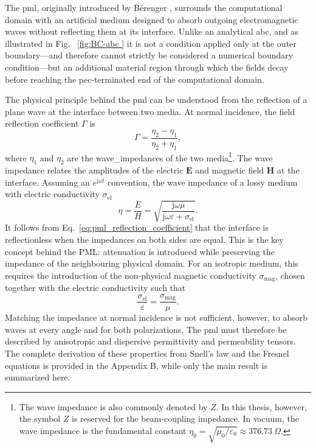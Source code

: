 The \gls{pml}, originally introduced by Bérenger \cite{berenger_perfectly_1994}, surrounds the computational domain with an artificial medium designed to absorb outgoing electromagnetic waves without reflecting them at its interface. Unlike an analytical \gls{abc}, and as illustrated in Fig.~ \ref{fig:BC-abc } it is not a condition applied only at the outer boundary---and therefore cannot strictly be considered a numerical boundary condition---but an additional material region through which the fields decay before reaching the \gls{pec}-terminated end of the computational domain.

The physical principle behind the \gls{pml} can be understood from the reflection of a plane wave at the interface between two media. At normal incidence, the field reflection coefficient $\Gamma$ is
%
\begin{equation}
\Gamma
=
\frac{\eta_2-\eta_1}
{\eta_2+\eta_1},
\label{eq:pml_reflection_coefficient}
\end{equation}
%
where $\eta_1$ and $\eta_2$ are the \glspl{wave_impedance} of the two media\footnote{The wave impedance is also commonly denoted by $Z$. In this thesis, however, the symbol $Z$ is reserved for the beam-coupling impedance. In vacuum, the wave impedance is the fundamental constant $\eta_0=\sqrt{\mu_0/\varepsilon_0}\approx 376.73~\Omega$.}. The wave impedance relates the amplitudes of the electric $\mathbf{E}$ and magnetic field $\mathbf{H}$ at the interface. Assuming an $e^{\mathrm{j}\omega t}$ convention, the wave impedance of a lossy medium with electric conductivity $\sigma_{\mathrm{el}}$
%
\begin{equation}
\eta
=
\frac{E}{H}
=
\sqrt{
\frac{\mathrm{j}\omega\mu}
{\mathrm{j}\omega\varepsilon+\sigma_{\mathrm{el}}} }.
\label{eq:pml_lossy_wave_impedance}
\end{equation}
%
It follows from Eq.~\eqref{eq:pml_reflection_coefficient} that the interface is reflectionless when the impedances on both sides are equal. This is the key concept behind the PML: attenuation is introduced while preserving the impedance of the neighbouring physical domain. For an isotropic medium, this requires the introduction of the non-physical magnetic conductivity $\sigma_{\mathrm{mag}}$, chosen together with the electric conductivity such that
%
\begin{equation}
\frac{\sigma_{\mathrm{el}}}{\varepsilon}
=
\frac{\sigma_{\mathrm{mag}}}{\mu}.
\label{eq:pml_conductivity_matching}
\end{equation}
%
Matching the impedance at normal incidence is not sufficient, however, to absorb waves at every angle and for both polarizations. The \gls{pml} must therefore be described by anisotropic and dispersive permittivity and permeability tensors. The complete derivation of these properties from Snell's law and the Fresnel equations is provided in the Appendix B, while only the main result is summarized here.

